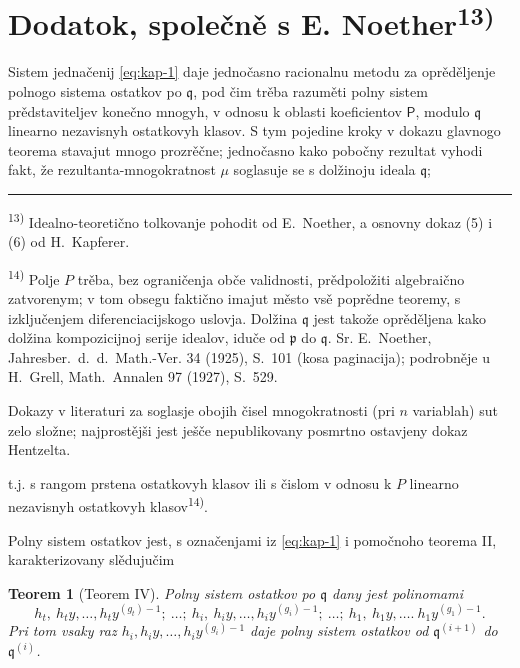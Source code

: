 \documentclass[11pt]{article}
\newcommand{\foreign}[1]{#1}
\theoremstyle{plain}
\newtheorem{satz}{Teorem}
\begin{document}
\newpage
\section*{Dodatok, společně s E. Noether\textsuperscript{13)}}

Sistem jednačenij \eqref{eq:kap-1} daje jednočasno racionalnu
metodu za oprěděljenje polnogo sistema ostatkov po $\mathfrak{q}$,
pod čim trěba razuměti polny sistem prědstaviteljev konečno mnogyh,
v odnosu k oblasti koeficientov $\mathsf{P}$, modulo $\mathfrak{q}$ linearno
nezavisnyh ostatkovyh klasov. S tym pojedine kroky v dokazu
glavnogo teorema stavajut mnogo prozrěčne; jednočasno kako
pobočny rezultat vyhodi fakt, že rezultanta-mnogokratnost $\mu$
soglasuje se s dolžinoju ideala $\mathfrak{q}$;

\vspace{0.5em}
\noindent\rule{\textwidth}{0.4pt}
\vspace{0.3em}

{\footnotesize
\textsuperscript{13)} Idealno-teoretično tolkovanje pohodit od E.\ Noether, a osnovny
dokaz (5) i (6) od H.\ Kapferer.

\textsuperscript{14)} Polje $P$ trěba, bez ograničenja obče validnosti, prědpoložiti
algebraično zatvorenym; v tom obsegu faktično imajut město vsě poprědne
teoremy, s izključenjem diferenciacijskogo uslovja. Dolžina
$\mathfrak{q}$ jest takože oprěděljena kako dolžina kompozicijnoj
serije idealov, iduče od $\mathfrak{p}$ do $\mathfrak{q}$. Sr.
E.\ Noether, \foreign{Jahresber.\ d.\ d.\ Math.-Ver.} 34 (1925), S.~101
(kosa paginacija); podrobněje u H.\ Grell, \foreign{Math.\ Annalen} 97
(1927), S.~529.

Dokazy v literaturi za soglasje obojih čisel mnogokratnosti (pri
$n$ variablah) sut zelo složne; najprostějši jest ješče nepublikovany
posmrtno ostavjeny dokaz Hentzelta.
}

\vspace{1em}
t.j. s rangom prstena ostatkovyh klasov ili s čislom v odnosu k $P$
linearno nezavisnyh ostatkovyh klasov\textsuperscript{14)}.

Polny sistem ostatkov jest, s označenjami iz \eqref{eq:kap-1} i
pomočnoho teorema II, karakterizovany slědujučim

\begin{satz}[Teorem IV]\label{satz:kap-IV}
Polny sistem ostatkov po $\mathfrak{q}$ dany jest polinomami
\[
h_{t},\ h_{t}y,\ldots,h_{t}y^{(g_{t})-1};\ \ldots;\
h_{i},\ h_{i}y,\ldots,h_{i}y^{(g_{i})-1};\ \ldots;\
h_{1},\ h_{1}y,\ldots.\ h_{1}y^{(g_{1})-1}.
\]
Pri tom vsaky raz
$h_{i}, h_{i}y, \ldots, h_{i}y^{(g_{i})-1}$ daje polny
sistem ostatkov od $\mathfrak{q}^{(i+1)}$ do
$\mathfrak{q}^{(i)}$.
\end{satz}
\end{document}
